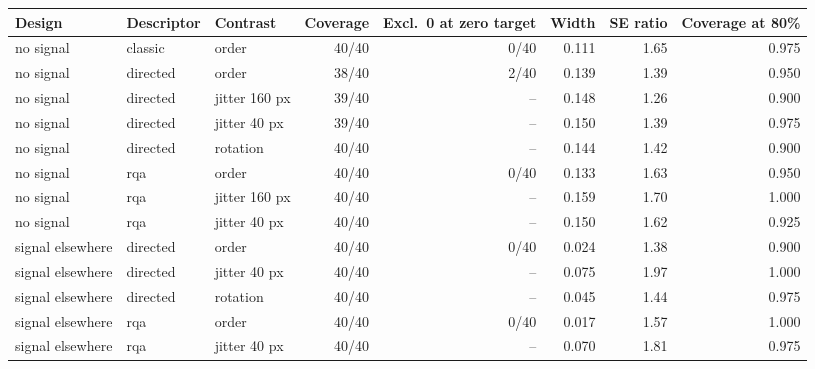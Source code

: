 \begin{tabular}{lllrrrrr}
\toprule
Design & Descriptor & Contrast & Coverage & Excl.\ 0 at zero target & Width & SE ratio & Coverage at 80\% \\
\midrule
no signal & classic & order & 40/40 & 0/40 & 0.111 & 1.65 & 0.975 \\
no signal & directed & order & 38/40 & 2/40 & 0.139 & 1.39 & 0.950 \\
no signal & directed & jitter 160 px & 39/40 & -- & 0.148 & 1.26 & 0.900 \\
no signal & directed & jitter 40 px & 39/40 & -- & 0.150 & 1.39 & 0.975 \\
no signal & directed & rotation & 40/40 & -- & 0.144 & 1.42 & 0.900 \\
no signal & rqa & order & 40/40 & 0/40 & 0.133 & 1.63 & 0.950 \\
no signal & rqa & jitter 160 px & 40/40 & -- & 0.159 & 1.70 & 1.000 \\
no signal & rqa & jitter 40 px & 40/40 & -- & 0.150 & 1.62 & 0.925 \\
signal elsewhere & directed & order & 40/40 & 0/40 & 0.024 & 1.38 & 0.900 \\
signal elsewhere & directed & jitter 40 px & 40/40 & -- & 0.075 & 1.97 & 1.000 \\
signal elsewhere & directed & rotation & 40/40 & -- & 0.045 & 1.44 & 0.975 \\
signal elsewhere & rqa & order & 40/40 & 0/40 & 0.017 & 1.57 & 1.000 \\
signal elsewhere & rqa & jitter 40 px & 40/40 & -- & 0.070 & 1.81 & 0.975 \\
\bottomrule
\end{tabular}
